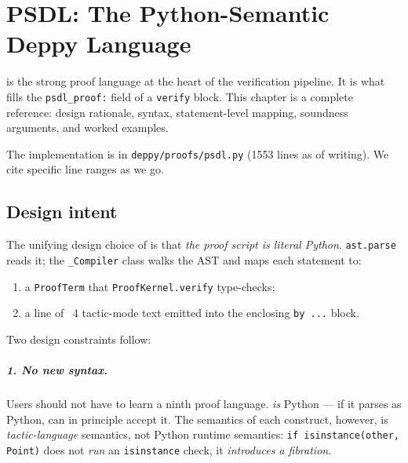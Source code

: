 \chapter{PSDL: The Python-Semantic Deppy Language}
\label{ch:psdl}

\PSDL{} is the strong proof language at the heart of the
\Deppy{} verification pipeline.  It is what fills the
\texttt{psdl\_proof:} field of a \texttt{verify} block.  This chapter
is a complete reference: design rationale, syntax, statement-level
mapping, soundness arguments, and worked examples.

The implementation is in
\texttt{deppy/proofs/psdl.py} (1553 lines as of writing).  We cite
specific line ranges as we go.

\section{Design intent}
\label{sec:psdl-design}

The unifying design choice of \PSDL{} is that \emph{the proof script
is literal Python}.  \texttt{ast.parse} reads it; the
\texttt{\_Compiler} class walks the AST and maps each statement to:
\begin{enumerate}[leftmargin=1.7em]
  \item a \Deppy{} \texttt{ProofTerm} that
    \texttt{ProofKernel.verify} type-checks;
  \item a line of \Lean{}~4 tactic-mode text emitted into the
    enclosing \texttt{by ...} block.
\end{enumerate}

Two design constraints follow:

\paragraph{1. No new syntax.} Users should not have to learn a
ninth proof language.  \PSDL{} \emph{is} Python --- if it parses as
Python, \PSDL{} can in principle accept it.  The semantics of each
construct, however, is \emph{tactic-language} semantics, not Python
runtime semantics: \texttt{if isinstance(other, Point)} does not
\emph{run} an \texttt{isinstance} check, it \emph{introduces a
fibration}.

